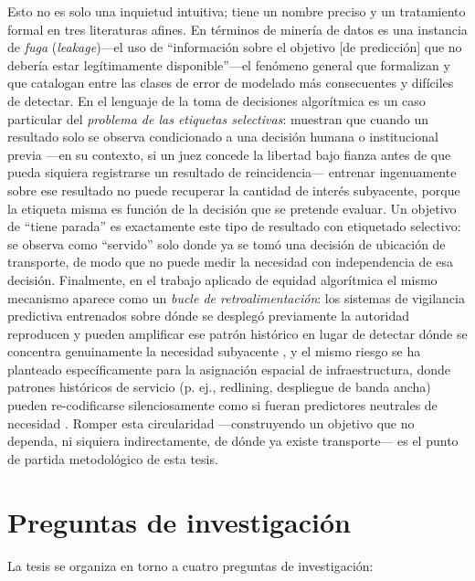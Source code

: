 Esto no es solo una inquietud intuitiva; tiene un nombre preciso y un tratamiento formal en
tres literaturas afines. En términos de minería de datos es una instancia de \emph{fuga}
(\emph{leakage})---el uso de ``información sobre el objetivo [de predicción] que no debería
estar legítimamente disponible''---el fenómeno general que formalizan
\textcite{kaufman2012leakage} y que catalogan entre las clases de error de modelado más
consecuentes y difíciles de detectar. En el lenguaje de la toma de decisiones algorítmica es
un caso particular del \emph{problema de las etiquetas selectivas}: \textcite{lakkaraju2017selectivelabels}
muestran que cuando un resultado solo se observa condicionado a una decisión humana o
institucional previa ---en su contexto, si un juez concede la libertad bajo fianza antes de
que pueda siquiera registrarse un resultado de reincidencia--- entrenar ingenuamente sobre
ese resultado no puede recuperar la cantidad de interés subyacente, porque la etiqueta misma
es función de la decisión que se pretende evaluar. Un objetivo de ``tiene parada'' es
exactamente este tipo de resultado con etiquetado selectivo: se observa como ``servido''
solo donde ya se tomó una decisión de ubicación de transporte, de modo que no puede medir la
necesidad con independencia de esa decisión. Finalmente, en el trabajo aplicado de equidad
algorítmica el mismo mecanismo aparece como un \emph{bucle de retroalimentación}: los
sistemas de vigilancia predictiva entrenados sobre dónde se desplegó previamente la
autoridad reproducen y pueden amplificar ese patrón histórico en lugar de detectar dónde se
concentra genuinamente la necesidad subyacente \parencite{lum2016predict, ensign2018runaway},
y el mismo riesgo se ha planteado específicamente para la asignación espacial de
infraestructura, donde patrones históricos de servicio (p. ej., redlining, despliegue de
banda ancha) pueden re-codificarse silenciosamente como si fueran predictores neutrales de
necesidad \parencite{flynn2022spacetime}. Romper esta circularidad ---construyendo un
objetivo que no dependa, ni siquiera indirectamente, de dónde ya existe transporte--- es el
punto de partida metodológico de esta tesis.

\section{Preguntas de investigación}
\label{sec:intro-preguntas}

La tesis se organiza en torno a cuatro preguntas de investigación:


